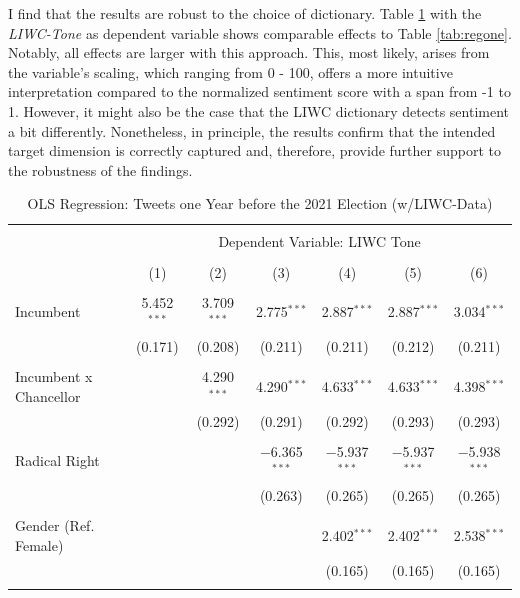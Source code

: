 \documentclass[a4paper,11pt]{article}
\begin{document}
I find that the results are robust to the choice of dictionary. Table \ref{tab:regliwcpreelection} with the \emph{LIWC-Tone} as dependent variable shows comparable effects to Table \ref{tab:regone}. Notably, all effects are larger with this approach. This, most likely, arises from the variable's scaling, which ranging from 0 - 100, offers a more intuitive interpretation compared to the normalized sentiment score with a span from -1 to 1. However, it might also be the case that the LIWC dictionary detects sentiment a bit differently. Nonetheless, in principle, the results confirm that the intended target dimension is correctly captured and, therefore, provide further support to the robustness of the findings.
\begin{table}[H]
    \centering
    \caption{OLS Regression: Tweets one Year before the 2021 Election (w/LIWC-Data)}
    \label{tab:regliwcpreelection}
\begingroup 
\scriptsize 
\begin{tabular}{@{\extracolsep{5pt}}lcccccc} 
\\[-1.8ex]\hline 
\hline \\[-1.8ex] 
 & \multicolumn{6}{c}{Dependent Variable: LIWC Tone} \\ 
\cline{2-7} 
\\[-1.8ex] & (1) & (2) & (3) & (4) & (5) & (6)\\ 
\hline \\[-1.8ex] 
 Incumbent & 5.452$^{***}$ & 3.709$^{***}$ & 2.775$^{***}$ & 2.887$^{***}$ & 2.887$^{***}$ & 3.034$^{***}$ \\ 
  & (0.171) & (0.208) & (0.211) & (0.211) & (0.212) & (0.211) \\ 
  & & & & & & \\ 
 Incumbent x Chancellor &  & 4.290$^{***}$ & 4.290$^{***}$ & 4.633$^{***}$ & 4.633$^{***}$ & 4.398$^{***}$ \\ 
  &  & (0.292) & (0.291) & (0.292) & (0.293) & (0.293) \\ 
  & & & & & & \\ 
 Radical Right &  &  & $-$6.365$^{***}$ & $-$5.937$^{***}$ & $-$5.937$^{***}$ & $-$5.938$^{***}$ \\ 
  &  &  & (0.263) & (0.265) & (0.265) & (0.265) \\ 
  & & & & & & \\ 
 Gender (Ref. Female) &  &  &  & 2.402$^{***}$ & 2.402$^{***}$ & 2.538$^{***}$ \\ 
  &  &  &  & (0.165) & (0.165) & (0.165) \\ 
  & & & & & & \\ 

\end{tabular}
\end{table}
\end{document}
